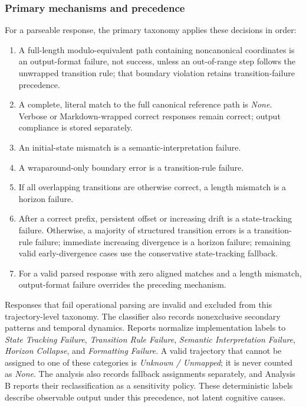 \documentclass{article}
\begin{document}
\subsubsection{Primary mechanisms and precedence}
    For a parseable response, the primary taxonomy applies these decisions in
    order:
\begin{enumerate}
        \item A full-length modulo-equivalent path containing noncanonical
        coordinates is an output-format failure, not success, unless an
        out-of-range step follows the unwrapped transition rule; that boundary
        violation retains transition-failure precedence.
        \item A complete, literal match to the full canonical reference path is
        \emph{None}. Verbose or Markdown-wrapped correct responses remain correct;
        output compliance is stored separately.
    \item An initial-state mismatch is a semantic-interpretation failure.
    \item A wraparound-only boundary error is a transition-rule failure.
        \item If all overlapping transitions are otherwise correct, a length
        mismatch is a horizon failure.
    \item After a correct prefix, persistent offset or increasing drift is a
    state-tracking failure. Otherwise, a majority of structured transition
    errors is a transition-rule failure; immediate increasing divergence is a
    horizon failure; remaining valid early-divergence cases use the
    conservative state-tracking fallback.
        \item For a valid parsed response with zero aligned matches and a length
        mismatch, output-format failure overrides the preceding mechanism.
\end{enumerate}
    Responses that fail operational parsing are invalid and excluded from this
    trajectory-level taxonomy.
The classifier also records nonexclusive secondary patterns and temporal
dynamics. Reports normalize implementation labels to \emph{State Tracking
Failure}, \emph{Transition Rule Failure}, \emph{Semantic Interpretation
Failure}, \emph{Horizon Collapse}, and \emph{Formatting Failure}. A valid
trajectory that cannot be assigned to one of these categories is
\emph{Unknown / Unmapped}; it is never counted as \emph{None}. The analysis
also records fallback assignments separately, and Analysis B reports their
reclassification as a sensitivity policy. These deterministic labels describe
observable output under this precedence, not latent cognitive causes.
\end{document}
